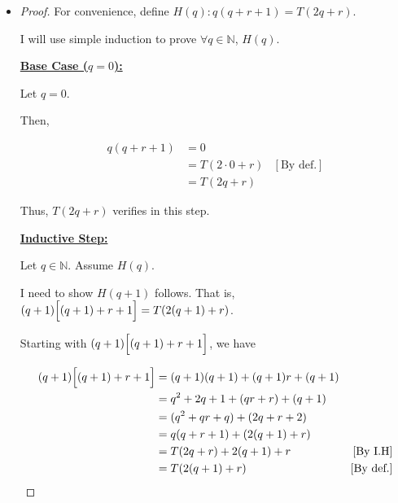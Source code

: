 \documentclass[12pt]{article}
\begin{document}
\begin{itemize}

    \item

    \begin{proof}
    \setcounter{equation}{0}

    For convenience, define $H(q): q(q + r + 1) = T(2q+r)$.

    \bigskip

    I will use simple induction to prove $\forall q \in \mathbb{N}$, $H(q)$.

    \bigskip

    \underline{\textbf{Base Case ($q = 0$):}}

    \bigskip

    Let $q = 0$.

    \bigskip

    Then,

    \begin{align}
        q(q + r + 1) &= 0\\
        &= T(2\cdot 0 + r) & [\text{By def.}]\\
        &= T(2q + r)
    \end{align}

    \bigskip

    Thus, $T(2q+r)$ verifies in this step.

    \bigskip

    \underline{\textbf{Inductive Step:}}

    \bigskip

    Let $q \in \mathbb{N}$. Assume $H(q)$.

    \bigskip

    I need to show $H(q+1)$ follows. That is, $(q+1)\Bigl[ (q+1) + r + 1 \Bigr] = T(2(q+1) + r)$.

    \bigskip

    Starting with $(q+1)\Bigl[ (q+1) + r + 1 \Bigr]$, we have

    \bigskip


    \begin{align}
        (q+1)\Bigl[ (q+1) + r + 1 \Bigr] &= (q+1)(q+1) + (q+1)r + (q+1)\\
        &= q^2 + 2q + 1 + (qr+r) + (q+1)\\
        &= (q^2 + qr + q) + (2q + r + 2)\\
        &= q(q + r + 1) + (2(q+1) + r)\\
        &= T(2q+r) + 2(q+1) + r & [\text{By I.H}]\\
        &= T(2(q+1) + r) & [\text{By def.}]
    \end{align}


\end{proof}
\end{itemize}
\end{document}

